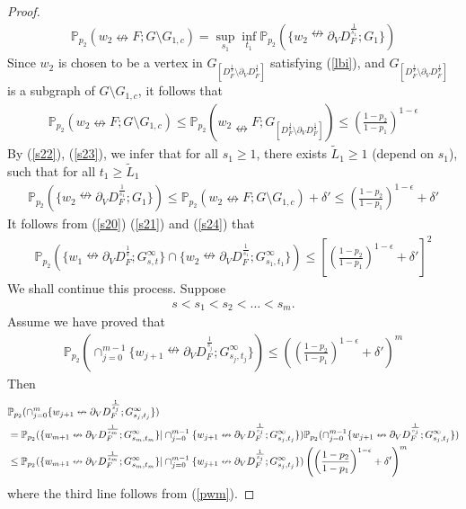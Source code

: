 \documentclass[10pt,a4paper]{amsart}
\newcommand\PP{{\mathbb P}}
\begin{document}
\begin{proof}
\begin{align}
\PP_{p_2}(w_2\nleftrightarrow F; G\setminus G_{1,c})=
\sup_{s_1}\inf_{t_1}\PP_{p_2}(\{w_2\nleftrightarrow \partial_V D_F^{\frac{1}{s_1}};G_1\})\label{s22}
\end{align}
Since $w_2$ is chosen to be a vertex in $G_{\left[D_{F}^{\frac{1}{s}}\setminus \partial_VD_{F}^{\frac{1}{s}}\right]}$ satisfying (\ref{lbi}), and $G_{\left[D_{F}^{\frac{1}{s}}\setminus \partial_VD_{F}^{\frac{1}{s}}\right]}$ is a subgraph of $G\setminus G_{1,c}$, it follows that 
\begin{align}
\PP_{p_2}(w_2\nleftrightarrow F; G\setminus G_{1,c})\leq \PP_{p_2}\left(w_2\nleftrightarrow F; G_{\left[D_{F}^{\frac{1}{s}}\setminus \partial_VD_{F}^{\frac{1}{s}}\right]}\right)\leq\left(\frac{1-p_2}{1-p_1}\right)^{1-\epsilon}\label{s23}
\end{align}
By (\ref{s22}), (\ref{s23}), we infer that for all $s_1\geq 1$, there exists $\tilde{L}_1\geq 1$ (depend on $s_1$), such that for all $t_1\geq \tilde{L}_1$
\begin{align}
 \PP_{p_2}(\{w_2\nleftrightarrow \partial_V D_F^{\frac{1}{s_1}};G_1\})\le \PP_{p_2}(w_2\nleftrightarrow F;G\setminus G_{1,c})+\delta'\leq \left(\frac{1-p_2}{1-p_1}\right)^{1-\epsilon}+\delta'\label{s24}
\end{align}
It follows from (\ref{s20}) (\ref{s21}) and (\ref{s24}) that
\begin{align*}
\PP_{p_2}(\{w_1\nleftrightarrow \partial_V D_F^{\frac{1}{s}};G_{s,t}^{\infty}\}\cap \{w_2\nleftrightarrow \partial_V D_F^{\frac{1}{s_1}};G_{s_1,t_1}^{\infty}\})\leq \left[\left(\frac{1-p_2}{1-p_1}\right)^{1-\epsilon}+\delta'\right]^2
\end{align*}
We shall continue this process. Suppose
\begin{align}
s<s_1<s_2<\ldots<s_{m}.\label{sic}
\end{align}
Assume we have proved that 
\begin{align}
\PP_{p_2}(\cap_{j=0}^{m-1}\{w_{j+1}\nleftrightarrow \partial_V D_F^{\frac{1}{s_j}};G_{s_j,t_j}^{\infty}\})\leq 
\left(\left(\frac{1-p_2}{1-p_1}\right)^{1-\epsilon}+\delta'\right)^{m}\label{pwm}
\end{align}
Then 
\begin{align}
\label{s20m}
&\PP_{p_2}(\cap_{j=0}^{m}\{w_{j+1}\nleftrightarrow \partial_V D_F^{\frac{1}{s_j}};G_{s_j,t_j}^{\infty}\})\\
&=\PP_{p_2}(\{w_{m+1}\nleftrightarrow \partial_V D_F^{\frac{1}{s_m}};G_{s_m,t_m}^{\infty}\}|\cap_{j=0}^{m-1}\{w_{j+1}\nleftrightarrow \partial_V D_F^{\frac{1}{s_j}};G_{s_j,t_j}^{\infty}\})\PP_{p_2}(\cap_{j=0}^{m-1}\{w_{j+1}\nleftrightarrow \partial_V D_F^{\frac{1}{s_j}};G_{s_j,t_j}^{\infty}\})\notag\\
&\leq \PP_{p_2}(\{w_{m+1}\nleftrightarrow \partial_V D_F^{\frac{1}{s_m}};G_{s_m,t_m}^{\infty}\}|\cap_{j=0}^{m-1}\{w_{j+1}\nleftrightarrow \partial_V D_F^{\frac{1}{s_j}};G_{s_j,t_j}^{\infty}\})\left(\left(\frac{1-p_2}{1-p_1}\right)^{1-\epsilon}+\delta'\right)^{m}\notag
\end{align}
where the third line follows from (\ref{pwm}).


\end{proof}
\end{document}
